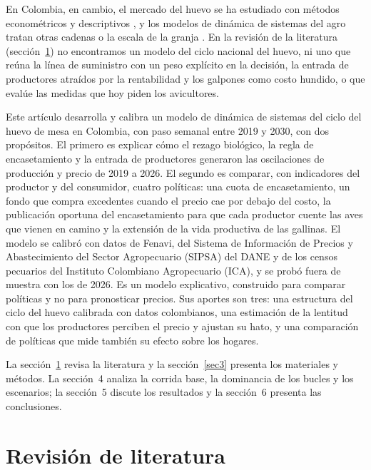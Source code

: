 \documentclass[preprint,12pt,authoryear]{elsarticle}
\begin{document}
En Colombia, en cambio, el mercado del huevo se ha estudiado con métodos econométricos y descriptivos \citep{EcheverrySilva2009,RodriguezTorres2020}, y los modelos de dinámica de sistemas del agro tratan otras cadenas o la escala de la granja \citep{AnaconaMopan2023,ParraOrtega2025}. En la revisión de la literatura (sección~\ref{sec2}) no encontramos un modelo del ciclo nacional del huevo, ni uno que reúna la línea de suministro con un peso explícito en la decisión, la entrada de productores atraídos por la rentabilidad y los galpones como costo hundido, o que evalúe las medidas que hoy piden los avicultores.

Este artículo desarrolla y calibra un modelo de dinámica de sistemas del ciclo del huevo de mesa en Colombia, con paso semanal entre 2019 y 2030, con dos propósitos. El primero es explicar cómo el rezago biológico, la regla de encasetamiento y la entrada de productores generaron las oscilaciones de producción y precio de 2019 a 2026. El segundo es comparar, con indicadores del productor y del consumidor, cuatro políticas: una cuota de encasetamiento, un fondo que compra excedentes cuando el precio cae por debajo del costo, la publicación oportuna del encasetamiento para que cada productor cuente las aves que vienen en camino y la extensión de la vida productiva de las gallinas. El modelo se calibró con datos de Fenavi, del Sistema de Información de Precios y Abastecimiento del Sector Agropecuario (SIPSA) del DANE y de los censos pecuarios del Instituto Colombiano Agropecuario (ICA), y se probó fuera de muestra con los de 2026. Es un modelo explicativo, construido para comparar políticas y no para pronosticar precios. Sus aportes son tres: una estructura del ciclo del huevo calibrada con datos colombianos, una estimación de la lentitud con que los productores perciben el precio y ajustan su hato, y una comparación de políticas que mide también su efecto sobre los hogares.

La sección~\ref{sec2} revisa la literatura y la sección~\ref{sec3} presenta los materiales y métodos. La sección~4 analiza la corrida base, la dominancia de los bucles y los escenarios; la sección~5 discute los resultados y la sección~6 presenta las conclusiones.

\section{Revisión de literatura}
\label{sec2}
\end{document}

